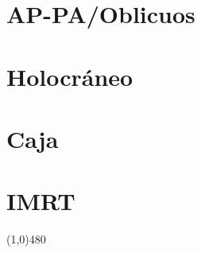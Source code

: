 \documentclass{article}
\begin{document}
\section*{AP-PA/Oblicuos}

\vspace{3pt}

\section*{Holocráneo}

\vspace{3pt}

\section*{Caja}

\vspace{3pt}


\section*{IMRT}
    
\vspace{3pt}


\begin{center}
\line(1,0){480}
\end{center}
\end{document}
